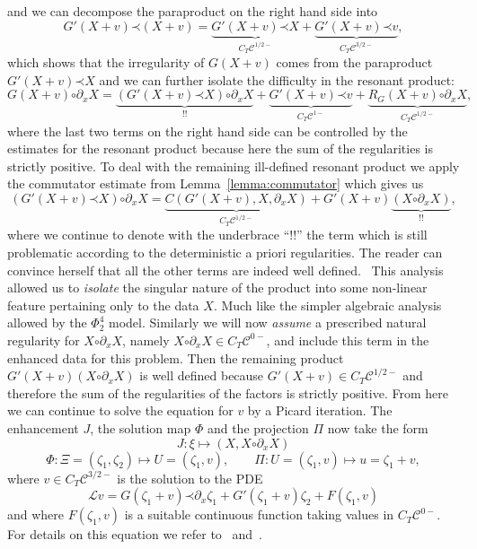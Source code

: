 \documentclass[a4paper, 11pt]{article}
\newcommand{\tmtextit}[1]{{\itshape{#1}}}
\newcommand{\LL}{\mathcal{L}}
\newcommand{\para}{\mathord{\prec}}
\newcommand{\reso}{\mathord{\circ}}
\begin{document}
and we can decompose the paraproduct on the right hand side into
\[ G' (X + v) \para (X + v) = \underbrace{G' (X + v) \para X}_{C_T
   \mathcal{C}^{1 / 2 -}} + \underbrace{G' (X + v) \para v}_{C_T
   \mathcal{C}^{3 / 2 -}}, \]
which shows that the irregularity of $G (X + v)$ comes from the paraproduct
${G' (X + v) \para X}$ and we can further isolate the difficulty in the resonant
product:
\[ G (X + v) \reso \partial_x X = \underbrace{(G' (X + v) \para X) \reso
   \partial_x X}_{!!} + \underbrace{G' (X + v) \para v}_{C_T \mathcal{C}^{1
   -}} + \underbrace{R_G (X + v) \reso \partial_x X}_{C_T \mathcal{C}^{1 / 2
   -}}, \]
where the last two terms on the right hand side can be controlled by the
estimates for the resonant product because here the sum of the regularities is
strictly positive. To deal with the remaining ill-defined resonant product we
apply the commutator estimate from Lemma~\ref{lemma:commutator} which gives us
\[ (G' (X + v) \para X) \reso \partial_x X = \underbrace{C (G' (X + v), X,
   \partial_x X)}_{C_T \mathcal{C}^{1 / 2 -}} + G' (X + v) \underbrace{(X
   \reso \partial_x X)}_{!!}, \]
where we continue to denote with the underbrace ``!!'' the term which is still
problematic according to the deterministic a priori regularities. The reader
can convince herself that all the other terms are indeed well defined. \ This
analysis allowed us to \tmtextit{isolate} the singular nature of the product
into some non-linear feature pertaining only to the data $X$. Much like the
simpler algebraic analysis allowed by the $\Phi^4_2$ model. Similarly we will
now \tmtextit{assume} a prescribed natural regularity for $X \reso \partial_x
X$, namely $X \reso \partial_x X \in C_T \mathcal{C}^{0 -}$, and include this
term in the enhanced data for this problem. Then the remaining product $G' (X
+ v) (X \reso \partial_x X)$ is well defined because $G' (X + v) \in C_T
\mathcal{C}^{1 / 2 -}$ and therefore the sum of the regularities of the
factors is strictly positive. From here we can continue to solve the equation
for $v$ by a Picard iteration. The enhancement $J$, the solution map $\Phi$
and the projection $\Pi$ now take the form
\[ J : \xi \mapsto (X, X \reso \partial_x X) \]
\[ \Phi : \Xi = (\zeta_1, \zeta_2) \mapsto U = (\zeta_1, v), \qquad \Pi : U =
   (\zeta_1, v) \mapsto u = \zeta_1 + v, \]
where $v \in C_T \mathcal{C}^{3 / 2 -}$ is the solution to the PDE
\[ \LL v = G (\zeta_1 + v) \para \partial_x \zeta_1 + G' (\zeta_1 + v) \zeta_2
   + F (\zeta_1, v) \]
and where $F (\zeta_1, v)$ is a suitable continuous function taking values in
$C_T \mathcal{C}^{0 -}$. For details on this equation we refer to~\cite{hairer_rough_2011} and~\cite{gubinelli_paracontrolled_2015}.
\end{document}
